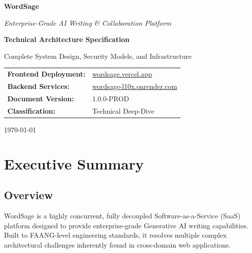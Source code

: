 \documentclass[12pt,a4paper]{report}
\begin{document}
\begin{titlepage}
    \centering
    \vspace*{2cm}
    
    {\Huge\bfseries\color{primary} WordSage \par}
    \vspace{0.5cm}
    {\Large\itshape Enterprise-Grade AI Writing \& Collaboration Platform \par}
    
    \vspace{2.5cm}
    
    {\LARGE \textbf{Technical Architecture Specification} \par}
    \vspace{1cm}
    {\large Complete System Design, Security Models, and Infrastructure \par}
    
    \vfill
    
    \begin{tabular}{ll}
        \textbf{Frontend Deployment:} & \href{https://wordsage.vercel.app}{wordsage.vercel.app} \\
        \textbf{Backend Services:} & \href{https://wordsage-l10x.onrender.com}{wordsage-l10x.onrender.com} \\
        \textbf{Document Version:} & 1.0.0-PROD \\
        \textbf{Classification:} & Technical Deep-Dive \\
    \end{tabular}
    
    \vspace{1.5cm}
    {\large \today \par}
\end{titlepage}

\tableofcontents
\newpage

\chapter{Executive Summary}

\section{Overview}
WordSage is a highly concurrent, fully decoupled Software-as-a-Service (SaaS) platform designed to provide enterprise-grade Generative AI writing capabilities. Built to FAANG-level engineering standards, it resolves multiple complex architectural challenges inherently found in cross-domain web applications.
\end{document}

